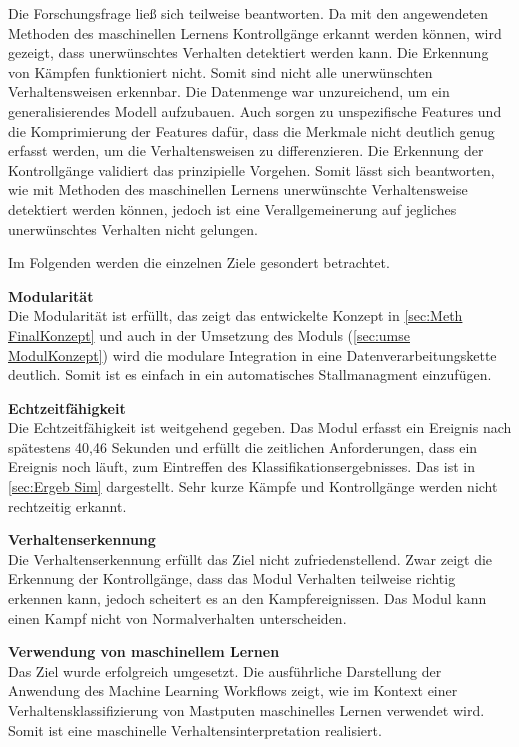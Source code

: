 Die Forschungsfrage ließ sich teilweise beantworten. Da mit den angewendeten Methoden des maschinellen Lernens Kontrollgänge erkannt werden können, wird gezeigt, dass unerwünschtes Verhalten detektiert werden kann. Die Erkennung von Kämpfen funktioniert nicht. Somit sind nicht alle unerwünschten Verhaltensweisen erkennbar. Die Datenmenge war unzureichend, um ein generalisierendes Modell aufzubauen. Auch sorgen zu unspezifische Features und die Komprimierung der Features dafür, dass die Merkmale nicht deutlich genug erfasst werden, um die Verhaltensweisen zu differenzieren. Die Erkennung der Kontrollgänge validiert das prinzipielle Vorgehen. Somit lässt sich beantworten, wie mit Methoden des maschinellen Lernens unerwünschte Verhaltensweise detektiert werden können, jedoch ist eine Verallgemeinerung auf jegliches unerwünschtes Verhalten nicht gelungen.\par

Im Folgenden werden die einzelnen Ziele gesondert betrachtet.

\textbf{Modularität}\\
Die Modularität ist erfüllt, das zeigt das entwickelte Konzept in \autoref{sec:Meth FinalKonzept} und auch in der Umsetzung des Moduls (\autoref{sec:umse ModulKonzept}) wird die modulare Integration in eine Datenverarbeitungskette deutlich. Somit ist es einfach in ein automatisches Stallmanagment einzufügen.\par

\textbf{Echtzeitfähigkeit}\\
Die Echtzeitfähigkeit ist weitgehend gegeben. Das Modul erfasst ein Ereignis nach spätestens 40,46 Sekunden und erfüllt die zeitlichen Anforderungen, dass ein Ereignis noch läuft, zum Eintreffen des Klassifikationsergebnisses. Das ist in \autoref{sec:Ergeb Sim} dargestellt. Sehr kurze Kämpfe und Kontrollgänge werden nicht rechtzeitig erkannt.\par

\textbf{Verhaltenserkennung}\\
Die Verhaltenserkennung erfüllt das Ziel nicht zufriedenstellend. Zwar zeigt die Erkennung der Kontrollgänge, dass das Modul Verhalten teilweise richtig erkennen kann, jedoch scheitert es an den Kampfereignissen. Das Modul kann einen Kampf nicht von Normalverhalten unterscheiden. \par

\textbf{Verwendung von maschinellem Lernen}\\
Das Ziel wurde erfolgreich umgesetzt. Die ausführliche Darstellung der Anwendung des Machine Learning Workflows zeigt, wie im Kontext einer Verhaltensklassifizierung von Mastputen maschinelles Lernen verwendet wird. Somit ist eine maschinelle Verhaltensinterpretation realisiert. \par

